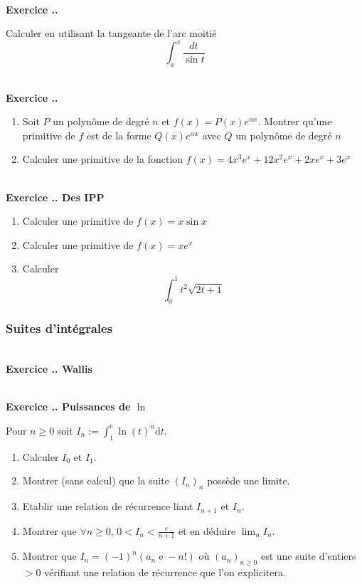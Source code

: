 \documentclass{article}
\newcommand{\di}{\mathrm{d}}
\newcommand{\ex}{{\operatorname{e}}}
\newcounter{exo}
\newcommand{\exercice}[1][\null]{\textbf{\\ Exercice \thesection.\theexo. #1} \addtocounter{exo}{1}}
\begin{document}
\exercice 

Calculer en utilisant la tangeante de l'arc moitié
\begin{equation*}
    \int_a^x \frac{dt}{\sin t}
\end{equation*}


\exercice

\begin{enumerate}
    \item Soit $P$ un polynôme de degré $n$ et 
        $f(x) = P(x) e^{\alpha x}$. Montrer qu'une 
        primitive de $f$ est de la forme $Q(x) e^{\alpha x}$
        avec $Q$ un polynôme de degré $n$

    \item Calculer une primitive de 
        la fonction $f(x) = 4x^3 e^x + 12x^2 e^x + 2x e^x + 3e^x$
\end{enumerate}

\exercice[Des IPP]

\begin{enumerate}
    \item Calculer une primitive de $f(x) = x \sin x$
    \item Calculer une primitive de $f(x) = x e^x$
    \item Calculer 
        \begin{equation*}
            \int_0^1 t^2 \sqrt{2t + 1}
        \end{equation*}
\end{enumerate}



\subsubsection{Suites d'intégrales}


\exercice[Wallis]

\exercice[Puissances de $\ln$]

Pour $n \ge 0$ soit $\displaystyle I_n := \int_{1}^{\ex} \ln(t)^n {\di} t$.

\begin{enumerate}

\item Calculer $I_0$ et $I_1$.

\item Montrer (sans calcul) que la suite $(I_n)_n$ possède une limite.

\item Etablir une relation de récurrence liant $I_{n+1}$ et $I_n$.

\item Montrer que $\forall n \ge 0$, $0<I_n<\frac{e}{n+1}$ et en déduire $\lim_n I_n$.

\item Montrer que $I_n = (-1)^n(a_n \ex - n!)$ où $(a_n)_{n \ge 0}$ est une suite d'entiers $>0$ vérifiant une relation de récurrence que l'on explicitera.

\end{enumerate}
\end{document}
